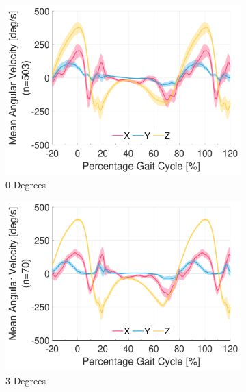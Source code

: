 \begin{figure}[!p]
    \centering
    \begin{subfigure}[b]{0.3\textwidth}
        \includegraphics[width=\textwidth]{content/3-Methods/ramp/ch3_ramp_0_degree_activity_walking_gyro_r_ankle.pdf}
        \caption{0 Degrees}
    \end{subfigure}
    \begin{subfigure}[b]{0.3\textwidth}
        \includegraphics[width=\textwidth]{content/3-Methods/ramp/ch3_ramp_3_degree_activity_ramp_down_gyro_r_ankle.pdf}
        \caption{3 Degrees}
    \end{subfigure}
    \begin{subfigure}[b]{0.3\textwidth}

\end{subfigure}
\end{figure}
